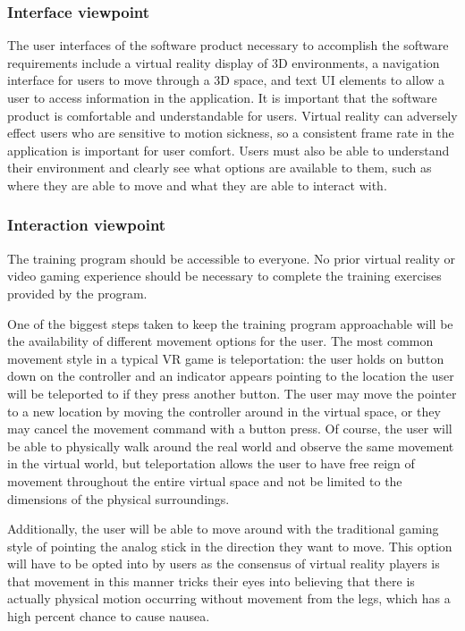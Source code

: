\documentclass[onecolumn, draftclsnofoot,10pt, compsoc]{IEEEtran}
\begin{document}
\subsubsection{Interface viewpoint}
The user interfaces of the software product necessary to accomplish the software requirements include a virtual reality display of 3D environments, a navigation interface for users to move through a 3D space, and text UI elements to allow a user to access information in the application. It is important that the software product is comfortable and understandable for users. Virtual reality can adversely effect users who are sensitive to motion sickness, so a consistent frame rate in the application is important for user comfort. Users must also be able to understand their environment and clearly see what options are available to them, such as where they are able to move and what they are able to interact with.

\subsubsection{Interaction viewpoint}
The training program should be accessible to everyone. No prior virtual reality or video gaming experience should be necessary to complete the training exercises provided by the program.

One of the biggest steps taken to keep the training program approachable will be the availability of different movement options for the user. The most common movement style in a typical VR game is teleportation: the user holds on button down on the controller and an indicator appears pointing to the location the user will be teleported to if they press another button. The user may move the pointer to a new location by moving the controller around in the virtual space, or they may cancel the movement command with a button press. Of course, the user will be able to physically walk around the real world and observe the same movement in the virtual world, but teleportation allows the user to have free reign of movement throughout the entire virtual space and not be limited to the dimensions of the physical surroundings.

Additionally, the user will be able to move around with the traditional gaming style of pointing the analog stick in the direction they want to move. This option will have to be opted into by users as the consensus of virtual reality players is that movement in this manner tricks their eyes into believing that there is actually physical motion occurring without movement from the legs, which has a high percent chance to cause nausea.
\end{document}

